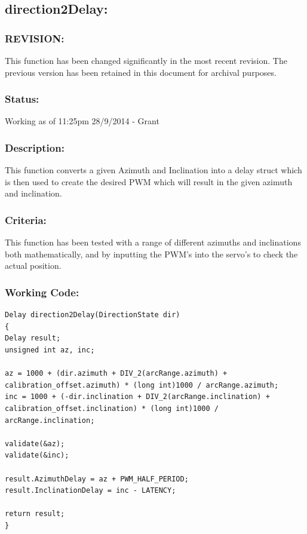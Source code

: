 \documentclass[]{report}
\begin{document}
\subsection{direction2Delay:}
\subsubsection{REVISION:}
This function has been changed significantly in the most recent revision. The previous version has been retained in this document for archival purposes.

\subsubsection{Status:}
Working as of 11:25pm 28/9/2014 - Grant

\subsubsection{Description:}
This function converts a given Azimuth and Inclination into a delay struct which is then used to create the desired PWM which will result in the given azimuth and inclination.

\subsubsection{Criteria:}
This function has been tested with a range of different azimuths and inclinations both mathematically, and by inputting the PWM's into the servo's to check the actual position.

\subsubsection{Working Code:}
\begin{lstlisting}
Delay direction2Delay(DirectionState dir)
{
Delay result;
unsigned int az, inc;

az = 1000 + (dir.azimuth + DIV_2(arcRange.azimuth) + calibration_offset.azimuth) * (long int)1000 / arcRange.azimuth;
inc = 1000 + (-dir.inclination + DIV_2(arcRange.inclination) + calibration_offset.inclination) * (long int)1000 / arcRange.inclination;

validate(&az);
validate(&inc);

result.AzimuthDelay = az + PWM_HALF_PERIOD;
result.InclinationDelay = inc - LATENCY;

return result;
}
\end{lstlisting}
\end{document}
